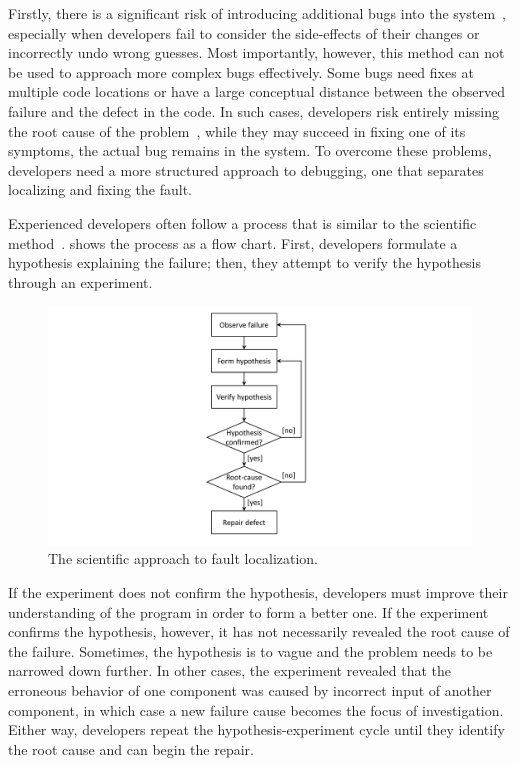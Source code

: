 Firstly, there is a significant risk of introducing additional bugs into the system~\cite{gugerty86:comprehension_differences_in_debugging,yin11:how_do_fixes_become}, especially when developers fail to consider the side-effects of their changes or incorrectly undo wrong guesses.
Most importantly, however, this method can not be used to approach more complex bugs effectively.
Some bugs need fixes at multiple code locations or have a large conceptual distance between the observed failure and the defect in the code.
In such cases, developers risk entirely missing the root cause of the problem~\cite{gu10:has_the_bug_really},
\ie while they may succeed in fixing one of its symptoms, the actual bug remains in the system.
To overcome these problems, developers need a more structured approach to debugging, one that separates localizing and fixing the fault.

Experienced developers often follow a process that is similar to the scientific method~\cite{araki91:a_general_framework}.
 shows the process as a flow chart.
First, developers formulate a hypothesis explaining the failure; then, they attempt to verify the hypothesis through an experiment. 
\begin{figure}[t]
\centering
\includegraphics[width=.4\linewidth]{img/workflow-scientific-method}
\caption{The scientific approach to fault localization.}
\label{fig:scientifiy-method}
\end{figure}
If the experiment does not confirm the hypothesis, developers must improve their understanding of the program in order to form a better one.
If the experiment confirms the hypothesis, however, it has not necessarily revealed the root cause of the failure.
Sometimes, the hypothesis is to vague and the problem needs to be narrowed down further.
In other cases, the experiment revealed that the erroneous behavior of one component was caused by incorrect input of another component, in which case a new failure cause becomes the focus of investigation.
Either way, developers repeat the hypothesis-experiment cycle until they identify the root cause and can begin the repair.

